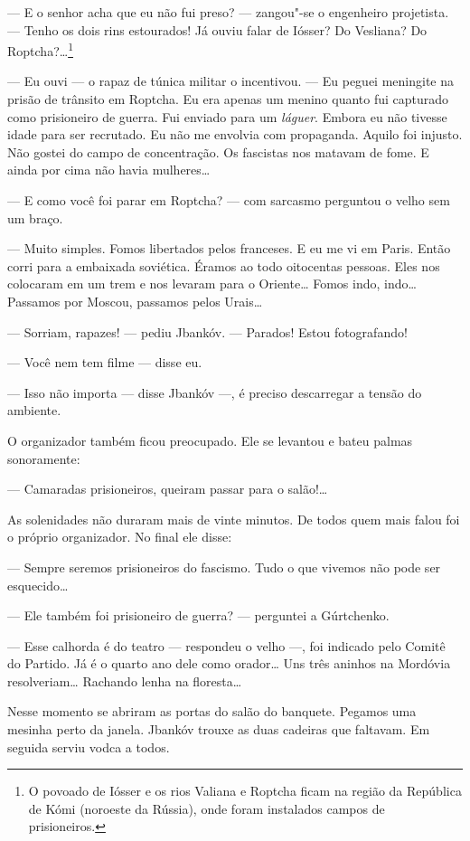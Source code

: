 --- E o senhor acha que eu não fui preso? --- zangou"-se o engenheiro
projetista. --- Tenho os dois rins estourados! Já ouviu falar de Iósser?
Do Vesliana? Do Roptcha?\ldots{}\footnote{O povoado de Iósser e os rios
  Valiana e Roptcha ficam na região da República de Kómi (noroeste da
  Rússia), onde foram instalados campos de prisioneiros.}

--- Eu ouvi --- o rapaz de túnica militar o incentivou. --- Eu peguei
meningite na prisão de trânsito em Roptcha. Eu era apenas um menino
quanto fui capturado como prisioneiro de guerra. Fui enviado para um
\emph{láguer}. Embora eu não tivesse idade para ser recrutado. Eu não me
envolvia com propaganda. Aquilo foi injusto. Não gostei do campo de
concentração. Os fascistas nos matavam de fome. E ainda por cima não
havia mulheres\ldots{}

--- E como você foi parar em Roptcha? --- com sarcasmo perguntou o velho
sem um braço.

--- Muito simples. Fomos libertados pelos franceses. E eu me vi em
Paris. Então corri para a embaixada soviética. Éramos ao todo oitocentas
pessoas. Eles nos colocaram em um trem e nos levaram para o Oriente\ldots{}
Fomos indo, indo\ldots{} Passamos por Moscou, passamos pelos Urais\ldots{}

--- Sorriam, rapazes! --- pediu Jbankóv. --- Parados! Estou
fotografando!

--- Você nem tem filme --- disse eu.

--- Isso não importa --- disse Jbankóv ---, é preciso descarregar a
tensão do ambiente.

O organizador também ficou preocupado. Ele se levantou e bateu palmas
sonoramente:

--- Camaradas prisioneiros, queiram passar para o salão!\ldots{}

As solenidades não duraram mais de vinte minutos. De todos quem mais
falou foi o próprio organizador. No final ele disse:

--- Sempre seremos prisioneiros do fascismo. Tudo o que vivemos não pode
ser esquecido\ldots{}

--- Ele também foi prisioneiro de guerra? --- perguntei a Gúrtchenko.

--- Esse calhorda é do teatro --- respondeu o velho ---, foi indicado
pelo Comitê do Partido. Já é o quarto ano dele como orador\ldots{} Uns três
aninhos na Mordóvia resolveriam\ldots{} Rachando lenha na floresta\ldots{}

Nesse momento se abriram as portas do salão do banquete. Pegamos uma
mesinha perto da janela. Jbankóv trouxe as duas cadeiras que faltavam.
Em seguida serviu vodca a todos.

